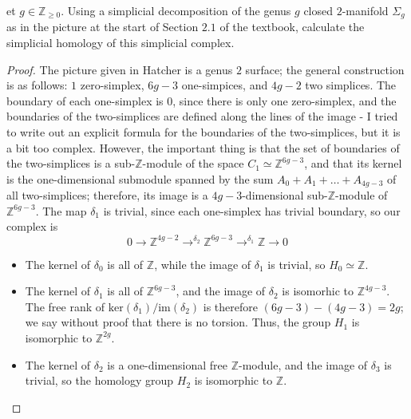 \documentclass[12pt]{article}
\newcommand{\Z}{\mathbb{Z}}
\theoremstyle{definition}
\newenvironment{problem}[2][Problem]{\begin{trivlist}
\item[\hskip \labelsep {\bfseries #1}\hskip \labelsep {\bfseries #2.}]}{\end{trivlist}}
\begin{document}
\begin{problem}
	Let $g \in \Z_{\geq 0}$. Using a simplicial decomposition of the genus $g$ closed $2$-manifold $\Sigma_g$ as in the picture at the start of Section $2.1$ of the textbook, calculate the simplicial homology of this simplicial complex. 	\begin{proof}
		The picture given in Hatcher is a genus $2$ surface; the general construction is as follows: $1$ zero-simplex, $6g-3$ one-simpices, and $4g-2$ two simplices. The boundary of each one-simplex is $0$, since there is only one zero-simplex, and the boundaries of the two-simplices are defined along the lines of the image - I tried to write out an explicit formula for the boundaries of the two-simplices, but it is a bit too complex. However, the important thing is that the set of boundaries of the two-simplices is a sub-$\Z$-module of the space $C_1 \simeq \Z^{6g-3}$, and that its kernel is the one-dimensional submodule spanned by the sum $A_0 + A_1 + \dots + A_{4g-3}$ of all two-simplices; therefore, its image is a $4g-3$-dimensional sub-$\Z$-module of $\Z^{6g-3}$. The map $\delta_1$ is trivial, since each one-simplex has trivial boundary, so our complex is 
		\[0 \to \Z^{4g-2} \to^{\delta_2} \Z^{6g-3} \to^{\delta_1} \Z \to 0\]
		\begin{itemize}
			\item The kernel of  $\delta_0$ is all of $\Z$, while the image of $\delta_1$ is trivial, so $H_0 \simeq \Z$.
			\item The kernel of $\delta_1$ is all of $\Z^{6g-3}$, and the image of $\delta_2$ is isomorhic to $\Z^{4g-3}$. The free rank of $\text{ker}(\delta_1)/ \text{im}(\delta_2)$ is therefore $(6g - 3) - (4g - 3) = 2g$; we say without proof that there is no torsion. Thus, the group $H_1$ is isomorphic to $\Z^{2g}$. 
			\item The kernel of $\delta_2$ is a one-dimensional free $\Z$-module, and the image of $\delta_3$ is trivial, so the homology group $H_2$ is isomorphic to $\Z$. 
	\end{itemize}
	\end{proof}
\end{problem}
\end{document}
